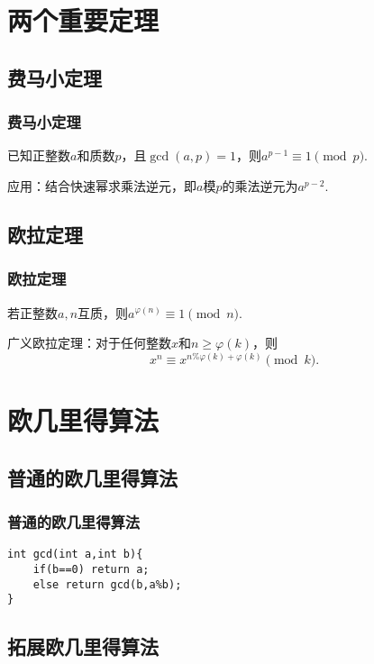 \documentclass[xcolor=dvipsnames]{beamer}
\def\geq{\geqslant}
\def\dou{，\!\!}
\begin{document}
    \section{两个重要定理}

    \subsection{费马小定理}

    \begin{frame}
        \frametitle{费马小定理}

        已知正整数$a$和质数$p$\dou 且$\gcd (a,p)=1$\dou 则$a^{p-1}\equiv 1\pmod{p}$.\pause

        应用：\!\!结合快速幂求乘法逆元\dou 即$a$模$p$的乘法逆元为$a^{p-2}$.
    \end{frame}

    \subsection{欧拉定理}

    \begin{frame}
        \frametitle{欧拉定理}

        若正整数$a,n$互质\dou 则$a^{\varphi(n)}\equiv 1\pmod{n}$.\pause

        广义欧拉定理：\!\!对于任何整数$x$和$n\geq\varphi(k)$\dou 则$$x^n\equiv x^{n\%\varphi(k)+\varphi(k)}\pmod{k}.$$
    \end{frame}

    \section{欧几里得算法}

    \subsection{普通的欧几里得算法}

    \begin{frame}
        \frametitle{普通的欧几里得算法}

        \begin{lstlisting}
int gcd(int a,int b){
    if(b==0) return a;
    else return gcd(b,a%b);
}
        \end{lstlisting}
    \end{frame}

    \subsection{拓展欧几里得算法}
\end{document}
